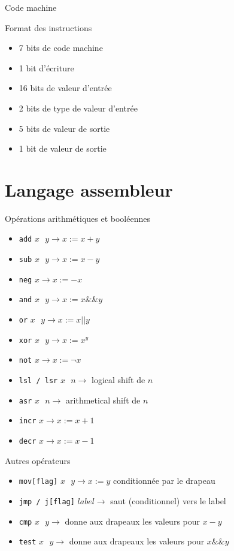 \documentclass[intlimits, 10pt]{beamer}
\begin{document}
	\begin{frame}{Code machine}
		\begin{block}{Format des instructions}
			\begin{itemize}	
				\item 7 bits de code machine
				\item 1 bit d'écriture
				\item 16 bits de valeur d'entrée
				\item 2 bits de type de valeur d'entrée
				\item 5 bits de valeur de sortie
				\item 1 bit de valeur de sortie
			\end{itemize}
		\end{block}
	\end{frame}
	
	\section{Langage assembleur}
	
	\begin{frame}{Opérations arithmétiques et booléennes}
		\begin{itemize}
		\item \texttt{add} $x \text{ } y \rightarrow x := x + y$
		\item \texttt{sub} $x \text{ } y \rightarrow x := x - y$
		\item \texttt{neg} $x \rightarrow x := - x $
		\item \texttt{and} $x \text{ } y \rightarrow x := x \&\& y$
		\item \texttt{or} $x \text{ } y \rightarrow x := x || y$
		\item \texttt{xor} $x \text{ } y \rightarrow x := x ^ y$
		\item \texttt{not} $x \rightarrow x := \neg x$
		\item \texttt{lsl / lsr} $x \text{ } n \rightarrow $ logical shift de $n$
		\item \texttt{asr} $x \text{ } n \rightarrow $ arithmetical shift de $n$
		\item \texttt{incr} $x \rightarrow x := x + 1$
		\item \texttt{decr} $x \rightarrow x := x - 1$
		\end{itemize}
	\end{frame}
	
	\begin{frame}{Autres opérateurs}
		\begin{itemize}
		\item \texttt{mov[flag]} $x \text{ } y \rightarrow x := y$ conditionnée par le drapeau
		\item \texttt{jmp / j[flag]} $label \rightarrow $ saut (conditionnel) vers le label \\
		\item \texttt{cmp} $x \text{ } y \rightarrow $ donne aux drapeaux les valeurs pour $x - y$
		\item \texttt{test} $x \text{ } y \rightarrow $ donne aux drapeaux les valeurs pour $x \&\& y$
		\end{itemize}
	\end{frame}
\end{document}
